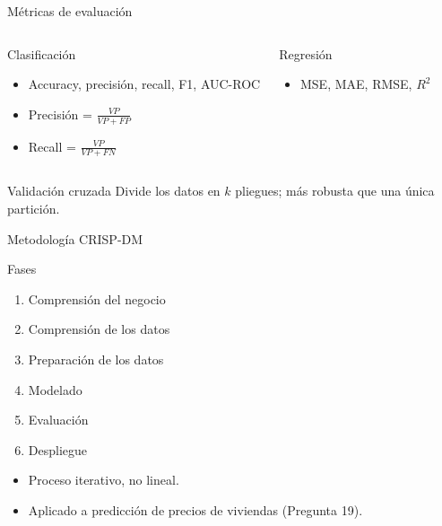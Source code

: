 \documentclass[aspectratio=169, 10pt, xcolor=table]{beamer}
\begin{document}
\begin{frame}{Métricas de evaluación}
    \begin{columns}[t]
        \begin{block}{Clasificación}
            \begin{itemize}
                \item Accuracy, precisión, recall, F1, AUC-ROC
                \item Precisión = $\frac{VP}{VP+FP}$
                \item Recall = $\frac{VP}{VP+FN}$
            \end{itemize}
        \end{block}
        \begin{block}{Regresión}
            \begin{itemize}
                \item MSE, MAE, RMSE, $R^2$
            \end{itemize}
        \end{block}
    \end{columns}
    \vspace{0.2cm}
    \begin{exampleblock}{Validación cruzada}
        Divide los datos en $k$ pliegues; más robusta que una única partición.
    \end{exampleblock}
\end{frame}

\begin{frame}{Metodología CRISP-DM}
    \begin{block}{Fases}
        \begin{enumerate}
            \item Comprensión del negocio
            \item Comprensión de los datos
            \item Preparación de los datos
            \item Modelado
            \item Evaluación
            \item Despliegue
        \end{enumerate}
    \end{block}
    \begin{itemize}
        \item Proceso iterativo, no lineal.
        \item Aplicado a predicción de precios de viviendas (Pregunta 19).
    \end{itemize}
\end{frame}
\end{document}

